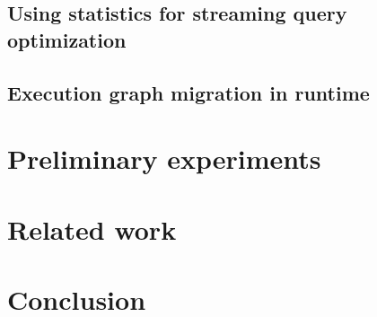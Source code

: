 \documentclass[runningheads]{llncs}
\begin{document}
\subsection{Using statistics for streaming query optimization}


\subsection{Execution graph migration in runtime}


\section {Preliminary experiments}


\section{Related work}


\section{Conclusion}




\end{document}
